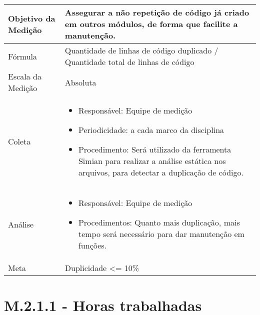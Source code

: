	\begin{tabular}{ |p{4cm}|p{8cm}|  }
	 \hline
	 Objetivo da Medição 		& 	Assegurar a não repetição de código já criado em outros módulos, de forma que facilite a manutenção.   \\
	 \hline
	 Fórmula		& 	Quantidade de linhas de código duplicado / Quantidade total de linhas de código	\\
	 \hline
	 Escala da Medição 		& Absoluta		 \\
	 \hline
	 Coleta		& 	\begin{itemize} \item Responsável: Equipe de medição \item Periodicidade: a cada marco da disciplina \item Procedimento: Será utilizado da ferramenta Simian para realizar a análise estática nos arquivos, para detectar a duplicação de código.\end{itemize}	\\
	 \hline
	 Análise		& 	\begin{itemize} \item Responsável: Equipe de medição \item Procedimentos: Quanto mais duplicação, mais tempo será necessário para dar manutenção em funções. \end{itemize}	 \\
	 \hline
	 Meta		& 	Duplicidade <= 10\%	 \\
	 \hline
	\end{tabular}

\section{M.2.1.1 - Horas trabalhadas} %

